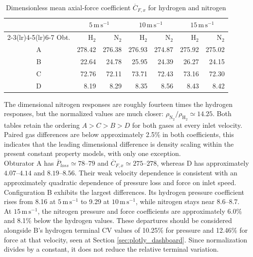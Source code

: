 \begin{table}[htbp]
\centering
\small
\begin{tabular}{@{}crrrrrr@{}}
\toprule
& \multicolumn{2}{c}{$5\,\mathrm{m\,s^{-1}}$} & \multicolumn{2}{c}{$10\,\mathrm{m\,s^{-1}}$} & \multicolumn{2}{c}{$15\,\mathrm{m\,s^{-1}}$}\\
\cmidrule(lr){2-3}\cmidrule(lr){4-5}\cmidrule(lr){6-7}
Obt. & $\mathrm{H}_2$ & $\mathrm{N}_2$ & $\mathrm{H}_2$ & $\mathrm{N}_2$ & $\mathrm{H}_2$ & $\mathrm{N}_2$\\
\midrule
A & 278.42 & 276.38 & 276.93 & 274.87 & 275.92 & 275.02\\
B & 22.64 & 24.78 & 25.95 & 24.39 & 26.27 & 24.15\\
C & 72.76 & 72.11 & 73.71 & 72.43 & 73.16 & 72.30\\
D & 8.19 & 8.29 & 8.35 & 8.56 & 8.43 & 8.42\\
\bottomrule
\end{tabular}
\caption{Dimensionless mean axial-force coefficient $\overline{C}_{F,x}$ for hydrogen and nitrogen}
\label{tab:force_coefficients_gases}
\end{table}

The dimensional nitrogen responses are roughly fourteen times the hydrogen responses, but the normalized values are much closer: $\rho_{\mathrm{N}_2}/\rho_{\mathrm{H}_2}\simeq14.25$. Both tables retain the ordering $A>C>B>D$ for both gases at every inlet velocity. Paired gas differences are below approximately 2.5\% in both coefficients, this indicates that the leading dimensional difference is density scaling within the present constant property models, with only one exception.\\

Obturator A has $\overline{P}_{loss}\simeq78$--$79$ and $\overline{C}_{F,x}\simeq275$--$278$, whereas D has approximately $4.07$--$4.14$ and $8.19$--$8.56$. Their weak velocity dependence is consistent with an approximately quadratic dependence of pressure loss and force on inlet speed.\\

Configuration B exhibits the largest differences. Its hydrogen pressure coefficient rises from 8.16 at $5\,\mathrm{m\,s^{-1}}$ to 9.29 at $10\,\mathrm{m\,s^{-1}}$, while nitrogen stays near 8.6--8.7. At $15\,\mathrm{m\,s^{-1}}$, the nitrogen pressure and force coefficients are approximately 6.0\% and 8.1\% below the hydrogen values. These departures should be considered alongside B's hydrogen terminal CV values of 10.25\% for pressure and 12.46\% for force at that velocity, seen at Section \ref{sec:plotly_dashboard}. Since normalization divides by a constant, it does not reduce the relative terminal variation.\\

